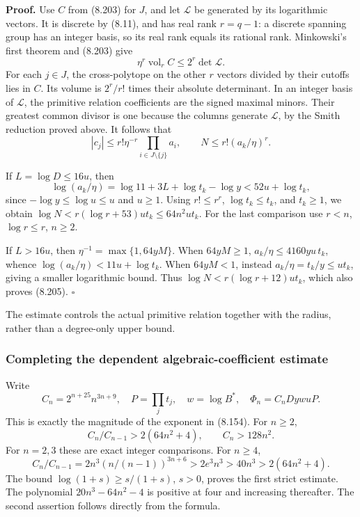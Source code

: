 \documentclass[
  11pt,
  a4paper,
]{article}
\begin{document}
\textbf{Proof.} Use \(C\) from (8.203) for \(J\), and let \(\mathcal L\)
be generated by its logarithmic vectors. It is discrete by (8.11), and
has real rank \(r=q-1\): a discrete spanning group has an integer basis,
so its real rank equals its rational rank. Minkowski's first theorem and
(8.203) give \[
\eta^r\operatorname{vol}_r C\le2^r\det\mathcal L.
\] For each \(j\in J\), the cross-polytope on the other \(r\) vectors
divided by their cutoffs lies in \(C\). Its volume is \(2^r/r!\) times
their absolute determinant. In an integer basis of \(\mathcal L\), the
primitive relation coefficients are the signed maximal minors. Their
greatest common divisor is one because the columns generate
\(\mathcal L\), by the Smith reduction proved above. It follows that \[
|c_j|\le r!\eta^{-r}\prod_{i\in J\setminus\{j\}}a_i,
\qquad N\le r!(a_k/\eta)^r.
\]

If \(L=\log D\le16u\), then \[
\log(a_k/\eta)=\log11+3L+\log t_k-\log y
<52u+\log t_k,
\] since \(-\log y\le\log u\le u\) and \(u\ge1\). Using \(r!\le r^r\),
\(\log t_k\le t_k\), and \(t_k\ge1\), we obtain
\(\log N<r(\log r+53)u t_k\le64n^2u t_k\). For the last comparison use
\(r<n\), \(\log r\le r\), \(n\ge2\).

If \(L>16u\), then \(\eta^{-1}=\max\{1,64yM\}\). When \(64yM\ge1\),
\(a_k/\eta\le4160yu\,t_k\), whence \(\log(a_k/\eta)<11u+\log t_k\). When
\(64yM<1\), instead \(a_k/\eta=t_k/y\le u t_k\), giving a smaller
logarithmic bound. Thus \(\log N<r(\log r+12)u t_k\), which also proves
(8.205). \(\square\)

The estimate controls the actual primitive relation together with the
radius, rather than a degree-only upper bound.

\subsubsection{Completing the dependent algebraic-coefficient
estimate}\label{completing-the-dependent-algebraic-coefficient-estimate}

Write \[
C_n=2^{n+25}n^{3n+9},\quad P=\prod_jt_j,\quad
w=\log B^*,\quad \Phi_n=C_nD ywuP.
\] This is exactly the magnitude of the exponent in (8.154). For
\(n\ge2\), \[
C_n/C_{n-1}>2(64n^2+4),\qquad C_n>128n^2.
\tag{8.206}
\] For \(n=2,3\) these are exact integer comparisons. For \(n\ge4\), \[
C_n/C_{n-1}
=2n^3(n/(n-1))^{3n+6}>2e^3n^3>40n^3>2(64n^2+4).
\] The bound \(\log(1+s)\ge s/(1+s)\), \(s>0\), proves the first strict
estimate. The polynomial \(20n^3-64n^2-4\) is positive at four and
increasing thereafter. The second assertion follows directly from the
formula.
\end{document}
